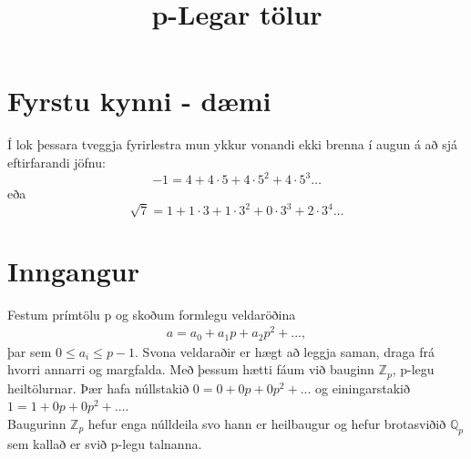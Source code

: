 

\title{p-Legar tölur}

\maketitle
\section*{Fyrstu kynni - dæmi}
Í lok þessara tveggja fyrirlestra mun ykkur vonandi ekki brenna í augun á að sjá eftirfarandi jöfnu:
\begin{equation*}
-1 = 4 + 4\cdot 5+4\cdot 5^2+4\cdot 5^3 \ldots
\end{equation*}
eða 
\begin{equation*}
\sqrt{7} = 1 + 1\cdot 3 + 1\cdot 3^2+0\cdot 3^3+2\cdot 3^4 \ldots
\end{equation*}

\section*{Inngangur}
Festum prímtölu p og skoðum formlegu veldaröðina
\begin{align*}
a = a_0 + a_1 p + a_2 p^2 + ...,
\end{align*}
þar sem $0 \leq a_i \leq p-1$. 
Svona veldaraðir er hægt að leggja saman, draga frá hvorri annarri
 og margfalda.
Með þessum hætti fáum við bauginn $\mathbb{Z}_p$, p-legu heiltölurnar.
Þær hafa núllstakið $0 = 0+0p+0p^2+...$ og 
einingarstakið $1 = 1 + 0p+0p^2+...$.
\\Baugurinn $\mathbb{Z}_p$ hefur enga núlldeila svo hann er heilbaugur 
og hefur brotasviðið $\mathbb{Q}_p$ sem kallað er svið p-legu talnanna.

